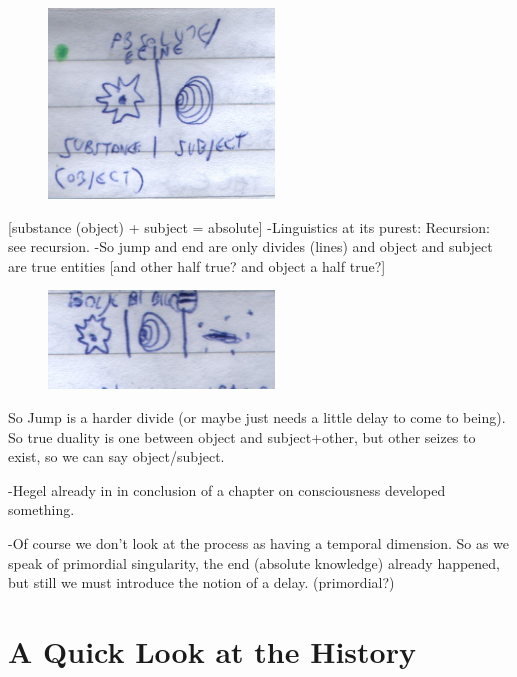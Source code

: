 \documentclass[10pt]{book}
\begin{document}
\begin{figure}[ht!]
\centering
\includegraphics[width=60mm]{scan09.jpg}
\label{overflow}
\end{figure}
[substance (object) +  subject = absolute]
-Linguistics at its purest: Recursion: see recursion.
-So jump and end are only divides (lines) and object and subject are true entities [and other half true? and object a half true?] 
\begin{figure}[ht!]
\centering
\includegraphics[width=60mm]{scan10.jpg}
\label{overflow}
\end{figure}
So Jump is a harder divide (or maybe just needs a little delay to come to being). So true duality is one between object and subject+other, but other seizes to exist, so we can say object/subject.

-Hegel already in in conclusion of a chapter on consciousness developed something.

-Of course we don't look at the process as having a temporal dimension. So as we speak of primordial singularity, the end (absolute knowledge) already happened, but still we must introduce the notion of a delay. (primordial?) 

\chapter{A Quick Look at the History}
\end{document}
